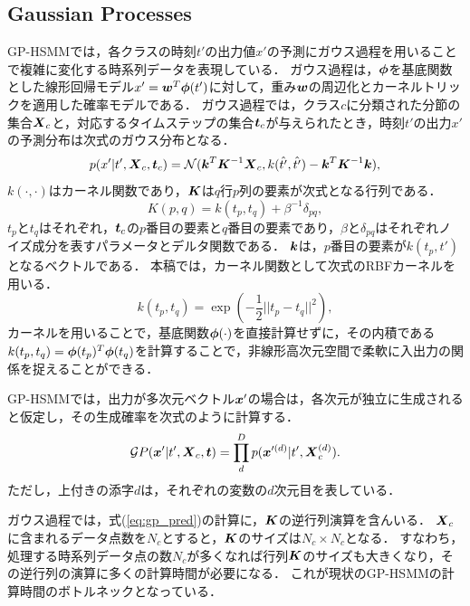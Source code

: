 \documentclass[conference]{IEEEtran}
\begin{document}
\subsection{Gaussian Processes}
GP-HSMMでは，各クラスの時刻$t'$の出力値$x'$の予測にガウス過程を用いることで複雑に変化する時系列データを表現している．
ガウス過程は，${\boldsymbol\phi}$を基底関数とした線形回帰モデル$x' = { \boldsymbol w}^T {\boldsymbol\phi}(t')$に対して，重み${ \boldsymbol w}$の周辺化とカーネルトリックを適用した確率モデルである．
ガウス過程では，クラス$c$に分類された分節の集合${ \boldsymbol X}_c$と，対応するタイムステップの集合${ \boldsymbol t}_c$が与えられたとき，時刻$t'$の出力$x'$の予測分布は次式のガウス分布となる．
%
\begin{equation}
p(x'|t',\bX_c, \bt_c)  = {\mathcal N}(\bk^{T}\bK^{-1}\bX_c, k(\hat{t'}, \hat{t'})-\bk^{T}\bK^{-1}\bk), \label{eq:gp_pred}
\end{equation}
%
$k(\cdot, \cdot)$はカーネル関数であり，${ \boldsymbol K}$は$q$行$p$列の要素が次式となる行列である．
%
\begin{equation}
\label{equ:covariance_func}
K(p, q)=k(t_{p},t_{q})+\beta^{-1}\delta_{pq}, 
\end{equation}
%
$t_p$と$t_q$はそれぞれ，${ \boldsymbol t}_c$の$p$番目の要素と$q$番目の要素であり，$\beta$と$\delta_{pq}$はそれぞれノイズ成分を表すパラメータとデルタ関数である．
${ \boldsymbol k}$は，$p$番目の要素が$k(t_p, t')$となるベクトルである．
本稿では，カーネル関数として次式のRBFカーネルを用いる．
%
\begin{equation}
k(t_p,t_q)=\exp(-\frac{1}{2}||t_{p}-t_{q}||^{2}), \label{eq:rbf}
\end{equation}
%
カーネルを用いることで，基底関数${\boldsymbol\phi}(\cdot)$を直接計算せずに，その内積である$k(t_p,t_q)={\boldsymbol\phi}(t_p)^T {\boldsymbol\phi}(t_q)$を計算することで，非線形高次元空間で柔軟に入出力の関係を捉えることができる．

GP-HSMMでは，出力が多次元ベクトル${ \boldsymbol x}'$の場合は，各次元が独立に生成されると仮定し，その生成確率を次式のように計算する．
%
\begin{equation}
\label{equ:multi_dim}
{\mathcal GP(\bx'|t', \bX_{c}, \bt)} = \prod_d^D p(\bx'^{(d)}|t', \bX^{(d)}_{c}).
\end{equation}
%
ただし，上付きの添字$d$は，それぞれの変数の$d$次元目を表している．

ガウス過程では，式(\ref{eq:gp_pred})の計算に，${ \boldsymbol K}$の逆行列演算を含んいる．
${ \boldsymbol X}_c$に含まれるデータ点数を$N_c$とすると，${ \boldsymbol K}$のサイズは$N_c \times N_c$となる．
すなわち，処理する時系列データ点の数$N_c$が多くなれば行列${ \boldsymbol K}$のサイズも大きくなり，その逆行列の演算に多くの計算時間が必要になる．
これが現状のGP-HSMMの計算時間のボトルネックとなっている．
\end{document}
